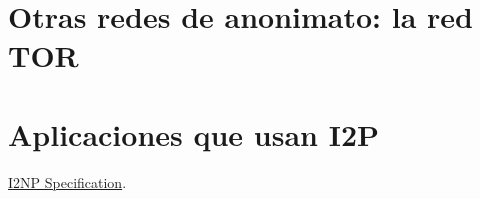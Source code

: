     \section{Otras redes de anonimato: la red TOR}
    
    
    
    
    \section{Aplicaciones que usan I2P}
    
    
   
\begin{thebibliography}{9}


   \href{https://geti2p.net/spec/i2np}{I2NP Specification}.
   
  
  
  

\end{thebibliography}

